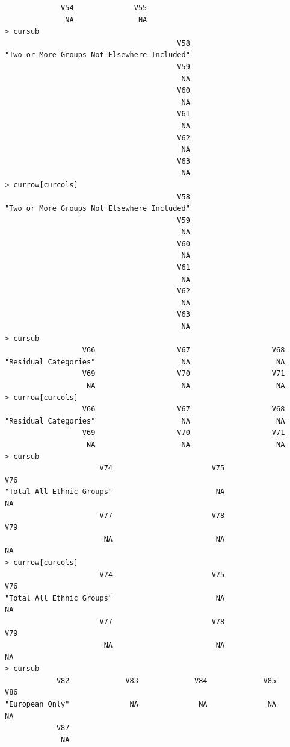 \documentclass[a4paper]{article}
\begin{document}
\begin{verbatim}
             V54              V55 
              NA               NA 
> cursub 
                                        V58 
"Two or More Groups Not Elsewhere Included" 
                                        V59 
                                         NA 
                                        V60 
                                         NA 
                                        V61 
                                         NA 
                                        V62 
                                         NA 
                                        V63 
                                         NA 
> currow[curcols] 
                                        V58 
"Two or More Groups Not Elsewhere Included" 
                                        V59 
                                         NA 
                                        V60 
                                         NA 
                                        V61 
                                         NA 
                                        V62 
                                         NA 
                                        V63 
                                         NA 
> cursub 
                  V66                   V67                   V68 
"Residual Categories"                    NA                    NA 
                  V69                   V70                   V71 
                   NA                    NA                    NA 
> currow[curcols] 
                  V66                   V67                   V68 
"Residual Categories"                    NA                    NA 
                  V69                   V70                   V71 
                   NA                    NA                    NA 
> cursub 
                      V74                       V75                       V76 
"Total All Ethnic Groups"                        NA                        NA 
                      V77                       V78                       V79 
                       NA                        NA                        NA 
> currow[curcols] 
                      V74                       V75                       V76 
"Total All Ethnic Groups"                        NA                        NA 
                      V77                       V78                       V79 
                       NA                        NA                        NA 
> cursub 
            V82             V83             V84             V85             V86 
"European Only"              NA              NA              NA              NA 
            V87 
             NA 

\end{verbatim}
\end{document}
